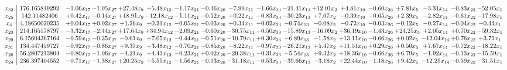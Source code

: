\documentclass[9pt]{article}
\begin{document}
 \[\begin{array}{c| c c@{\hskip 2pt} c@{\hskip 2pt} c@{\hskip 2pt} c@{\hskip 2pt} c@{\hskip 2pt} c@{\hskip 2pt} c@{\hskip 2pt} c@{\hskip 2pt} c@{\hskip 2pt} c@{\hskip 2pt} c@{\hskip 2pt} c@{\hskip 2pt} c@{\hskip 2pt} c@{\hskip 2pt} c@{\hskip 2pt} c@{\hskip 2pt} }
 x_{32}   &  176.165849292 & -1.06 x_{17} & -1.05 x_{27} & + 27.48 x_{9} & +  5.48 x_{12} & -1.17 x_{21} & -0.46 x_{20} & -7.99 x_{11} & -1.66 x_{33} & -21.41 x_{13} & + 12.01 x_{2} & +  4.81 x_{10} & -0.60 x_{26} & +  7.81 x_{5} & -3.31 x_{14} & -0.83 x_{22} & -52.05 x_{1}\\
 x_{25}   &  142.11482406 & +  0.42 x_{17} & -0.14 x_{27} & + 18.91 x_{9} & -12.18 x_{12} & -1.11 x_{21} & -0.52 x_{20} & +  0.22 x_{11} & -0.83 x_{33} & -30.23 x_{13} & +  7.07 x_{2} & -0.39 x_{10} & -0.65 x_{26} & +  2.39 x_{5} & -2.82 x_{14} & -0.61 x_{22} & -17.98 x_{1}\\
 x_{4}   &  4.18650020235 & +  0.04 x_{17} & +  0.02 x_{27} & +  1.26 x_{9} & -0.21 x_{12} & -0.05 x_{21} & -0.03 x_{20} & +  0.34 x_{11} & -0.02 x_{33} & -0.74 x_{13} & -0.08 x_{2} & -0.72 x_{10} & -0.03 x_{26} & -0.12 x_{5} & -0.27 x_{14} & -0.04 x_{22} & -0.44 x_{1}\\
 x_{23}   &  214.165178797 & -3.32 x_{17} & -2.44 x_{27} & + 17.64 x_{9} & + 34.94 x_{12} & -2.09 x_{21} & -0.60 x_{20} & -30.75 x_{11} & -0.50 x_{33} & -15.89 x_{13} & -16.09 x_{2} & + 36.19 x_{10} & -1.43 x_{26} & + 24.25 x_{5} & +  2.05 x_{14} & +  0.70 x_{22} & -59.32 x_{1}\\
 x_{29}   &  6.15604367164 & -0.59 x_{17} & -0.35 x_{27} & -0.61 x_{9} & +  7.05 x_{12} & -0.44 x_{21} & -0.51 x_{20} & -10.79 x_{11} & +  0.30 x_{33} & -6.89 x_{13} & -1.58 x_{2} & + 13.11 x_{10} & -0.66 x_{26} & +  0.02 x_{5} & -12.04 x_{14} & +  0.76 x_{22} & +  3.71 x_{1}\\
 x_{31}   &  134.447459727 & -0.92 x_{17} & -0.86 x_{27} & +  9.37 x_{9} & +  3.48 x_{12} & -0.70 x_{21} & -0.85 x_{20} & -8.22 x_{11} & -0.97 x_{33} & -26.21 x_{13} & +  5.47 x_{2} & + 11.51 x_{10} & +  0.29 x_{26} & +  0.50 x_{5} & +  7.67 x_{14} & -0.72 x_{22} & -18.22 x_{1}\\
 x_{28}   &  56.2807213804 & -0.80 x_{17} & -1.06 x_{27} & -4.21 x_{9} & +  4.43 x_{12} & -0.23 x_{21} & +  0.02 x_{20} & -20.38 x_{11} & -0.31 x_{33} & -5.54 x_{13} & +  9.32 x_{2} & + 18.36 x_{10} & -0.66 x_{26} & +  6.79 x_{5} & -1.92 x_{14} & -0.13 x_{22} & -15.59 x_{1}\\
 x_{24}   &  236.397404552 & -0.71 x_{17} & -1.38 x_{27} & + 20.25 x_{9} & +  5.55 x_{12} & -1.56 x_{21} & -0.13 x_{20} & -31.18 x_{11} & -0.53 x_{33} & -39.66 x_{13} & -3.18 x_{2} & + 22.44 x_{10} & -1.18 x_{26} & +  9.42 x_{5} & -12.25 x_{14} & -0.59 x_{22} & -31.51 x_{1}\\

\end{array}\]
\end{document}
